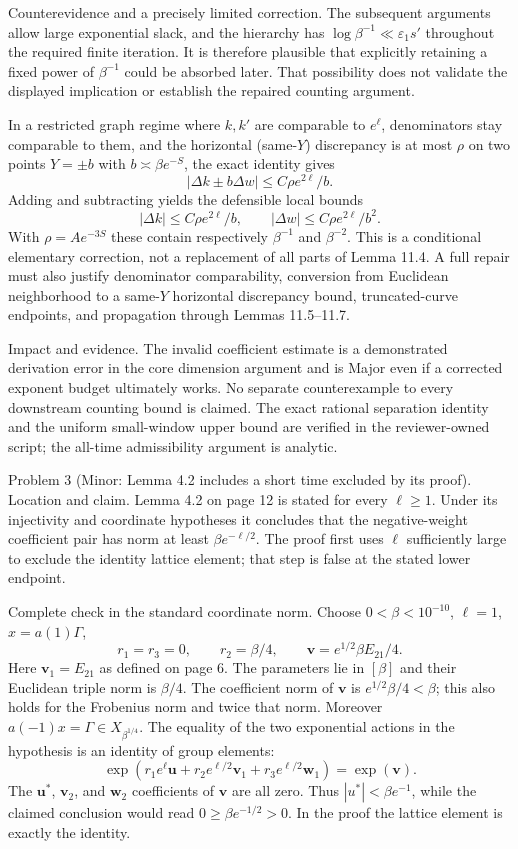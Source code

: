 \documentclass[10pt]{article}
\begin{document}
Counterevidence and a precisely limited correction. The subsequent arguments allow large exponential slack, and the hierarchy has \(\log\beta^{-1}\ll\varepsilon_1s'\) throughout the required finite iteration. It is therefore plausible that explicitly retaining a fixed power of \(\beta^{-1}\) could be absorbed later. That possibility does not validate the displayed implication or establish the repaired counting argument.\par
In a restricted graph regime where \(k,k'\) are comparable to \(e^\ell\), denominators stay comparable to them, and the horizontal (same-\(Y\)) discrepancy is at most \(\rho\) on two points \(Y=\pm b\) with \(b\asymp\beta e^{-S}\), the exact identity gives \[|\Delta k\pm b\Delta w|\leq C\rho e^{2\ell}/b.\] Adding and subtracting yields the defensible local bounds \[|\Delta k|\leq C\rho e^{2\ell}/b,\qquad
 |\Delta w|\leq C\rho e^{2\ell}/b^2.\] With \(\rho=Ae^{-3S}\) these contain respectively \(\beta^{-1}\) and \(\beta^{-2}\). This is a conditional elementary correction, not a replacement of all parts of Lemma 11.4. A full repair must also justify denominator comparability, conversion from Euclidean neighborhood to a same-\(Y\) horizontal discrepancy bound, truncated-curve endpoints, and propagation through Lemmas 11.5–11.7.\par
Impact and evidence. The invalid coefficient estimate is a demonstrated derivation error in the core dimension argument and is Major even if a corrected exponent budget ultimately works. No separate counterexample to every downstream counting bound is claimed. The exact rational separation identity and the uniform small-window upper bound are verified in the reviewer-owned script; the all-time admissibility argument is analytic.\par
Problem 3 (Minor: Lemma 4.2 includes a short time excluded by its proof).  Location and claim. Lemma 4.2 on page 12 is stated for every \(\ell\geq1\). Under its injectivity and coordinate hypotheses it concludes that the negative-weight coefficient pair has norm at least \(\beta e^{-\ell/2}\). The proof first uses \(\ell\) sufficiently large to exclude the identity lattice element; that step is false at the stated lower endpoint.\par
Complete check in the standard coordinate norm. Choose \(0<\beta<10^{-10}\), \(\ell=1\), \(x=a(1)\Gamma\), \[r_1=r_3=0,\qquad r_2=\beta/4,\qquad
 \mathbf v=e^{1/2}\beta E_{21}/4.\] Here \(\mathbf v_1=E_{21}\) as defined on page 6. The parameters lie in \([\beta]\) and their Euclidean triple norm is \(\beta/4\). The coefficient norm of \(\mathbf v\) is \(e^{1/2}\beta/4<\beta\); this also holds for the Frobenius norm and twice that norm. Moreover \(a(-1)x=\Gamma\in X_{\beta^{1/4}}\). The equality of the two exponential actions in the hypothesis is an identity of group elements: \[\exp(r_1e^\ell\mathbf u+r_2e^{\ell/2}\mathbf v_1+
                   r_3e^{\ell/2}\mathbf w_1)=\exp(\mathbf v).\] The \(\mathbf u^*\), \(\mathbf v_2\), and \(\mathbf w_2\) coefficients of \(\mathbf v\) are all zero. Thus \(|u^*|<\beta e^{-1}\), while the claimed conclusion would read \(0\geq\beta e^{-1/2}>0\). In the proof the lattice element is exactly the identity.\par
\end{document}
